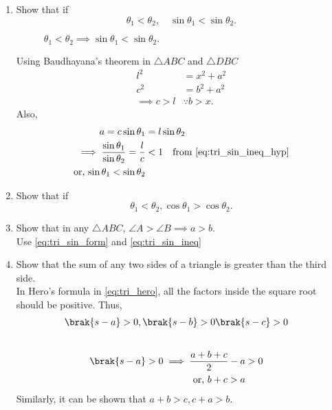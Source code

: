 \renewcommand{\theequation}{\theenumi}
\begin{enumerate}[label=\arabic*.,ref=\thesubsection.\theenumi]
\item
	Show that if
\begin{equation}
\label{ch5_sin_increasing}
\theta_1 < \theta_2, \quad \sin \theta_1 < \sin \theta_2.
\end{equation}	
\begin{figure}[!ht]
	\begin{center}
		
		\resizebox{\columnwidth}{!}{}
	\end{center}
	\caption{$\theta_1 < \theta_2 \implies \sin \theta_1 < \sin \theta_2.$}
	\label{fig:fig_sin_ineq}	
\end{figure}
%
\solution Using Baudhayana's theorem in $\triangle  ABC$ and $\triangle DBC$
%
\begin{align}
l^2 &= x^2+a^2
\\
c^2 &= b^2+a^2
\\
\implies c > l &\because b > x.
\label{eq:tri_sin_ineq_hyp}
\end{align}
%
Also, 
%
\begin{align}
a = c \sin \theta_1 &= l \sin \theta_2
%
\\
\implies 
\frac{\sin \theta_1}{\sin \theta_2} = \frac{l}{c} &< 1 \quad \text{from }\eqref{eq:tri_sin_ineq_hyp}
\\
\text{or, } {\sin \theta_1}<{\sin \theta_2}
\label{eq:tri_sin_ineq}
\end{align}
%
	\item
		Show that if
		\begin{equation}
		\label{ch5_cos_decreasing}
		\theta_1 < \theta_2, \cos \theta_1 > \cos \theta_2.
		\end{equation}	
%
\item	Show that in any $\triangle ABC$, $\angle A > \angle B \implies a > b$.
%
\\
\solution Use \eqref{eq:tri_sin_form} and \eqref{eq:tri_sin_ineq}
%
\item Show that the sum of any two sides of a triangle is greater than the third side.
\\
\solution In Hero's formula in \eqref{eq:tri_hero}, all the factors inside the square root should be positive.  Thus, 
%
\begin{align}
\brak{s-a} > 0, \brak{s-b} > 0\brak{s-c} &> 0
\end{align}
%
\begin{align}
\\
\brak{s-a} > 0 \implies \frac{a+b+c}{2} -a &> 0
\\
\text{or, } b+c > a
\end{align}
%
Similarly, it can be shown that $a+b>c, c+a>b$.



\end{enumerate}
